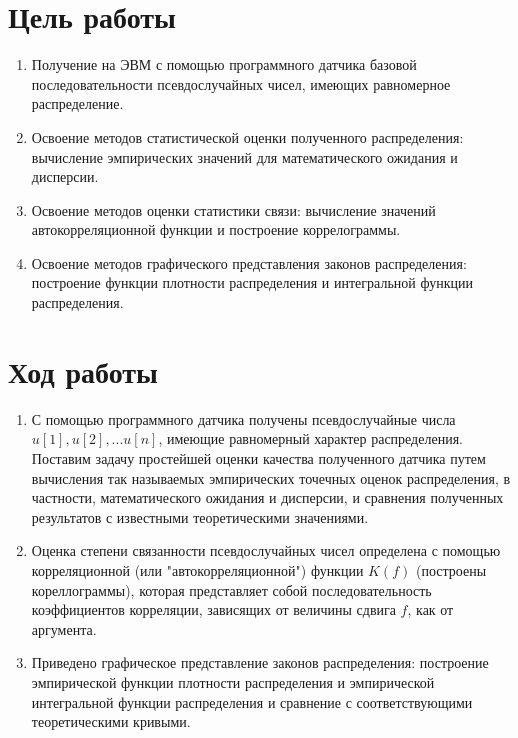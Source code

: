 \documentclass{article}
\begin{document}
	\section{Цель работы}
	\begin{enumerate}
	\item Получение на ЭВМ с помощью программного датчика
	базовой последовательности псевдослучайных чисел,
	имеющих равномерное распределение.
	\item Освоение методов статистической оценки полученного
	распределения: вычисление эмпирических значений
	для математического ожидания и дисперсии.
	\item Освоение методов оценки статистики связи: вычисление
	значений автокорреляционной функции и построение
	коррелограммы.
	\item Освоение методов графического представления законов
	распределения: построение функции плотности 
	распределения и интегральной функции распределения.
	\end{enumerate}
	
	\newpage
	
	\section{Ход работы}
	\begin {enumerate}
		\item С помощью программного датчика получены псевдослучайные числа $u[1],u[2],... u[n]$, имеющие равномерный характер распределения. Поставим  задачу простейшей оценки качества полученного датчика путем вычисления так называемых эмпирических точечных оценок распределения, в частности, математического ожидания и дисперсии, и сравнения полученных результатов с известными теоретическими значениями.
		\item Оценка  степени связанности псевдослучайных чисел определена с помощью корреляционной (или "автокорреляционной") функции $K(f)$ (построены кореллограммы), которая представляет собой последовательность коэффициентов корреляции, зависящих от величины сдвига $f$, как от аргумента.
		\item Приведено графическое представление законов распределения: построение эмпирической функции плотности распределения и эмпирической интегральной функции распределения и сравнение с соответствующими теоретическими кривыми.
	\end{enumerate}
	
\end{document}
